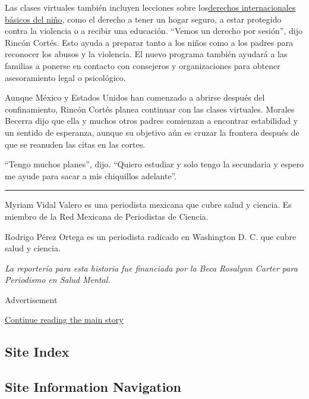 Las clases virtuales también incluyen lecciones sobre
los\href{https://www.unicef.org/es/convencion-derechos-nino/convencion-version-ninos}{derechos
internacionales básicos del niño}, como el derecho a tener un hogar
seguro, a estar protegido contra la violencia o a recibir una educación.
``Vemos un derecho por sesión'', dijo Rincón Cortés. Esto ayuda a
preparar tanto a los niños como a los padres para reconocer los abusos y
la violencia. El nuevo programa también ayudará a las familias a ponerse
en contacto con consejeros y organizaciones para obtener asesoramiento
legal o psicológico.

Aunque México y Estados Unidos han comenzado a abrirse después del
confinamiento, Rincón Cortés planea continuar con las clases virtuales.
Morales Becerra dijo que ella y muchos otros padres comienzan a
encontrar estabilidad y un sentido de esperanza, aunque su objetivo aún
es cruzar la frontera después de que se reanuden las citas en las
cortes.

``Tengo muchos planes'', dijo. ``Quiero estudiar y solo tengo la
secundaria y espero me ayude para sacar a mis chiquillos adelante''.

\begin{center}\rule{0.5\linewidth}{\linethickness}\end{center}

Myriam Vidal Valero es una periodista mexicana que cubre salud y
ciencia. Es miembro de la Red Mexicana de Periodistas de Ciencia.

Rodrigo Pérez Ortega es un periodista radicado en Washington D. C. que
cubre salud y ciencia.

\emph{La reportería para esta historia fue financiada por la Beca
Rosalynn Carter para Periodismo en Salud Mental.}

Advertisement

\protect\hyperlink{after-bottom}{Continue reading the main story}

\hypertarget{site-index}{%
\subsection{Site Index}\label{site-index}}

\hypertarget{site-information-navigation}{%
\subsection{Site Information
Navigation}\label{site-information-navigation}}

